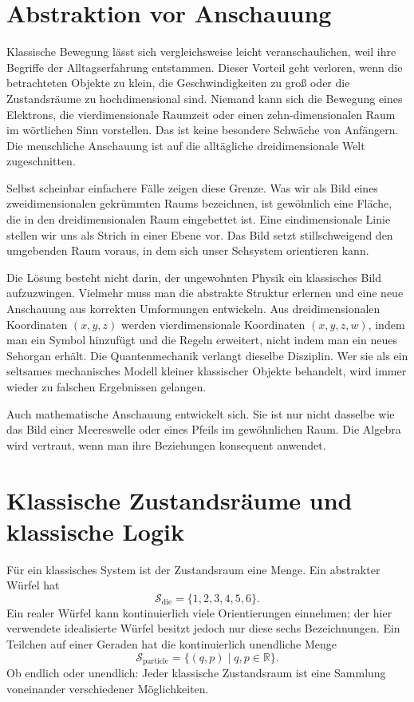 \section{Abstraktion vor Anschauung}

Klassische Bewegung lässt sich vergleichsweise leicht veranschaulichen, weil ihre Begriffe der Alltagserfahrung entstammen. Dieser Vorteil geht verloren, wenn die betrachteten Objekte zu klein, die Geschwindigkeiten zu groß oder die Zustandsräume zu hochdimensional sind. Niemand kann sich die Bewegung eines Elektrons, die vierdimensionale Raumzeit oder einen zehn-dimensionalen Raum im wörtlichen Sinn vorstellen. Das ist keine besondere Schwäche von Anfängern. Die menschliche Anschauung ist auf die alltägliche dreidimensionale Welt zugeschnitten.

Selbst scheinbar einfachere Fälle zeigen diese Grenze. Was wir als Bild eines zweidimensionalen gekrümmten Raums bezeichnen, ist gewöhnlich eine Fläche, die in den dreidimensionalen Raum eingebettet ist. Eine eindimensionale Linie stellen wir uns als Strich in einer Ebene vor. Das Bild setzt stillschweigend den umgebenden Raum voraus, in dem sich unser Sehsystem orientieren kann.

Die Lösung besteht nicht darin, der ungewohnten Physik ein klassisches Bild aufzuzwingen. Vielmehr muss man die abstrakte Struktur erlernen und eine neue Anschauung aus korrekten Umformungen entwickeln. Aus dreidimensionalen Koordinaten \((x,y,z)\) werden vierdimensionale Koordinaten \((x,y,z,w)\), indem man ein Symbol hinzufügt und die Regeln erweitert, nicht indem man ein neues Sehorgan erhält. Die Quantenmechanik verlangt dieselbe Disziplin. Wer sie als ein seltsames mechanisches Modell kleiner klassischer Objekte behandelt, wird immer wieder zu falschen Ergebnissen gelangen.

\begin{remark}
Auch mathematische Anschauung entwickelt sich. Sie ist nur nicht dasselbe wie das Bild einer Meereswelle oder eines Pfeils im gewöhnlichen Raum. Die Algebra wird vertraut, wenn man ihre Beziehungen konsequent anwendet.
\end{remark}

\section{Klassische Zustandsräume und klassische Logik}

Für ein klassisches System ist der Zustandsraum eine Menge. Ein abstrakter Würfel hat
\begin{equation}
  \mathcal S_{\mathrm{die}}=\{1,2,3,4,5,6\}.
\end{equation}
Ein realer Würfel kann kontinuierlich viele Orientierungen einnehmen; der hier verwendete idealisierte Würfel besitzt jedoch nur diese sechs Bezeichnungen. Ein Teilchen auf einer Geraden hat die kontinuierlich unendliche Menge
\begin{equation}
  \mathcal S_{\mathrm{particle}}
  =
  \{(q,p)\mid q,p\in\mathbb R\}.
\end{equation}
Ob endlich oder unendlich: Jeder klassische Zustandsraum ist eine Sammlung voneinander verschiedener Möglichkeiten.

